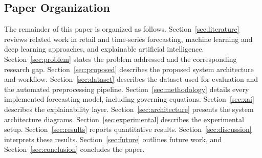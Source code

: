 \subsection{Paper Organization}
The remainder of this paper is organized as follows. Section~\ref{sec:literature} reviews related work in retail and time-series forecasting, machine learning and deep learning approaches, and explainable artificial intelligence. Section~\ref{sec:problem} states the problem addressed and the corresponding research gap. Section~\ref{sec:proposed} describes the proposed system architecture and workflow. Section~\ref{sec:dataset} describes the dataset used for evaluation and the automated preprocessing pipeline. Section~\ref{sec:methodology} details every implemented forecasting model, including governing equations. Section~\ref{sec:xai} describes the explainability layer. Section~\ref{sec:architecture} presents the system architecture diagrams. Section~\ref{sec:experimental} describes the experimental setup. Section~\ref{sec:results} reports quantitative results. Section~\ref{sec:discussion} interprets these results. Section~\ref{sec:future} outlines future work, and Section~\ref{sec:conclusion} concludes the paper.
